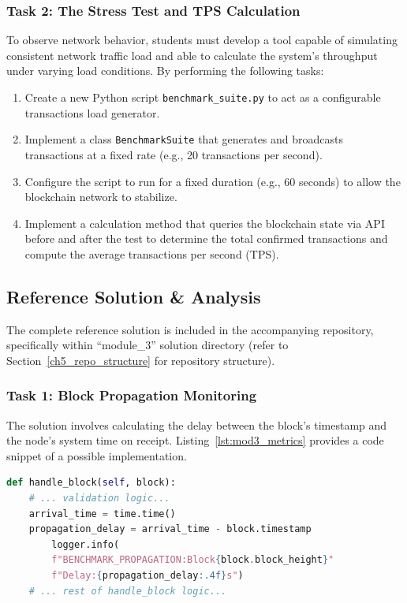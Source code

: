 \subsubsection*{Task 2: The Stress Test and TPS Calculation}
To observe network behavior, students must develop a tool capable of simulating consistent network traffic load and able to calculate the system's throughput under varying load conditions. By performing the following tasks:

\begin{enumerate}
    \item Create a new Python script \texttt{benchmark\_suite.py} to act as a configurable transactions load generator.
    \item Implement a class \texttt{BenchmarkSuite} that generates and broadcasts transactions at a fixed rate (e.g., 20 transactions per second).
    \item Configure the script to run for a fixed duration (e.g., 60 seconds) to allow the blockchain network to stabilize.
    \item Implement a calculation method that queries the blockchain state via API before and after the test to determine the total confirmed transactions and compute the average transactions per second (TPS).
\end{enumerate}

\subsection{Reference Solution \& Analysis}
The complete reference solution is included in the accompanying repository, specifically within \enquote{module\_3} solution directory (refer to Section~\ref{ch5_repo_structure} for repository structure).

\subsubsection*{Task 1: Block Propagation Monitoring} 
The solution involves calculating the delay between the block's timestamp and the node's system time on receipt. Listing~\ref{lst:mod3_metrics} provides a code snippet of a possible implementation.

\begin{lstlisting}[language=Python, caption=Propagation Delay Logging Code Snippet, label=lst:mod3_metrics]
def handle_block(self, block):
    # ... validation logic...
    arrival_time = time.time()
    propagation_delay = arrival_time - block.timestamp
        logger.info(
        f"BENCHMARK_PROPAGATION:Block{block.block_height}"
        f"Delay:{propagation_delay:.4f}s")
    # ... rest of handle_block logic...

\end{lstlisting}

